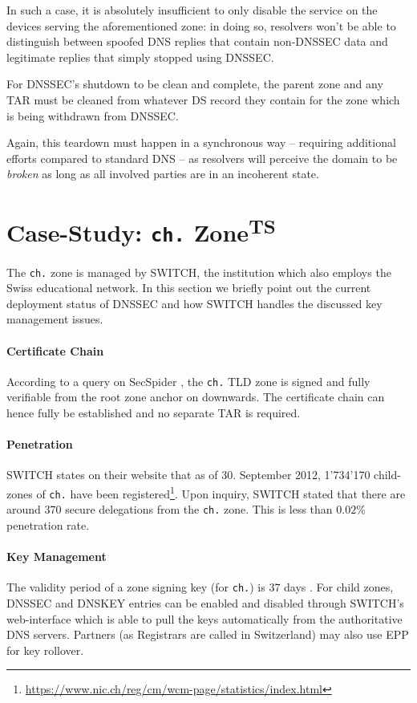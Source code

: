 \documentclass[a4paper,twocolumn]{scrartcl}
\newcommand{\wbts}{\textsuperscript{TS}}
\begin{document}
In such a case, it is absolutely insufficient to only disable the service on the devices serving the aforementioned  zone: in doing so, resolvers won't be able to distinguish between spoofed DNS replies that contain non-DNSSEC data and legitimate replies that simply stopped using DNSSEC.

For DNSSEC's shutdown to be clean and complete, the parent zone and any TAR must be cleaned from whatever DS record they contain for the zone which is being withdrawn from DNSSEC.

Again, this teardown must happen in a synchronous way -- requiring additional efforts compared to standard DNS -- as resolvers will perceive the domain to be \emph{broken} as long as all involved parties are in an incoherent state.


\section{Case-Study: \texttt{ch.} Zone\wbts}
\label{sec:case-study}

The \verb|ch.| zone is managed by SWITCH, the institution which also
employs the Swiss educational network. In this section we briefly
point out the current deployment status of DNSSEC and how SWITCH
handles the discussed key management issues.

\paragraph{Certificate Chain} According to a query on SecSpider
\cite{secspider}, the \verb|ch.| TLD zone is signed and fully
verifiable from the root zone anchor on downwards. The certificate
chain can hence fully be established and no separate TAR is required.

\paragraph{Penetration} SWITCH states on their website that as of
30. September 2012, 1'734'170 child-zones of \verb|ch.| have been
registered\footnote{\url{https://www.nic.ch/reg/cm/wcm-page/statistics/index.html}}. Upon
inquiry, SWITCH stated that there are around 370 secure delegations
from the \verb|ch.| zone. This is less than $0.02\%$ penetration
rate.

\paragraph{Key Management} The validity period of a zone signing key
(for \verb|ch.|) is 37 days \cite{switch10}. For child zones,  DNSSEC
and DNSKEY entries can be enabled and disabled through SWITCH's 
web-interface which is able to pull the keys automatically from the
authoritative DNS servers. Partners (as Registrars are called in
Switzerland) may also use EPP for key rollover.
\end{document}
